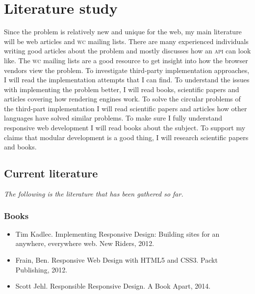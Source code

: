 \documentclass[oneside,a4paper,11pt]{kth-mag}
\begin{document}
\section*{Literature study}
Since the problem is relatively new and unique for the web, my main literature will be web articles and \textsc{w}\textsc{c} mailing lists. There are many experienced individuals writing good articles about the problem and mostly discusses how an \textsc{api} can look like. The \textsc{w}\textsc{c} mailing lists are a good resource to get insight into how the browser vendors view the problem. To investigate third-party implementation approaches, I will read the implementation attempts that I can find. To understand the issues with implementing the problem better, I will read books, scientific papers and articles covering how rendering engines work. To solve the circular problems of the third-part implementation I will read scientific papers and articles how other languages have solved similar problems. To make sure I fully understand responsive web development I will read books about the subject. To support my claims that modular development is a good thing, I will research scientific papers and books.

\subsection*{Current literature}
\emph{The following is the literature that has been gathered so far.}
\subsubsection*{Books}
\begin{itemize}
\item Tim Kadlec. Implementing Responsive Design: Building sites for an anywhere, everywhere web. New Riders, 2012.
\item Frain, Ben. Responsive Web Design with HTML5 and CSS3. Packt Publishing, 2012.
\item Scott Jehl. Responsible Responsive Design. A Book Apart, 2014.
\end{itemize}
\end{document}
